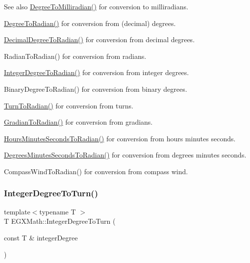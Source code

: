 \begin{DoxySeeAlso}{See also}
\mbox{\hyperlink{group___e_g_x_math-_angle_conversions-_degree_gae4fa6c2d3805430760783650cfbfdb11}{Degree\+To\+Milliradian()}} for conversion to milliradians. 

\mbox{\hyperlink{group___e_g_x_math-_angle_conversions-_degree_ga48585541b228c852c9d08a9eac3682f0}{Degree\+To\+Radian()}} for conversion from (decimal) degrees. 

\mbox{\hyperlink{group___e_g_x_math-_angle_conversions-_decimal_degree_ga906ee2c83cdf4caa59eb613dc2d5d52a}{Decimal\+Degree\+To\+Radian()}} for conversion from decimal degrees. 

Radian\+To\+Radian() for conversion from radians. 

\mbox{\hyperlink{group___e_g_x_math-_angle_conversions-_integer_degree_ga05d3368b00ea27b9895de2ffe5c8df38}{Integer\+Degree\+To\+Radian()}} for conversion from integer degrees. 

Binary\+Degree\+To\+Radian() for conversion from binary degrees. 

\mbox{\hyperlink{group___e_g_x_math-_angle_conversions-_turn_ga72e6d3c46ebfc25f7be5050136d8df16}{Turn\+To\+Radian()}} for conversion from turns. 

\mbox{\hyperlink{group___e_g_x_math-_angle_conversions-_gradian_ga7ea0a6f47a672715b960181606c8fd7b}{Gradian\+To\+Radian()}} for conversion from gradians. 

\mbox{\hyperlink{group___e_g_x_math-_angle_conversions-_hours_minutes_seconds_gaa0b04e9012ec739df1464298971e3be7}{Hours\+Minutes\+Seconds\+To\+Radian()}} for conversion from hours minutes seconds. 

\mbox{\hyperlink{group___e_g_x_math-_angle_conversions-_degrees_minutes_seconds_ga6c99d7a2a1646b3d9c8d40cd7f083aa4}{Degrees\+Minutes\+Seconds\+To\+Radian()}} for conversion from degrees minutes seconds. 

Compass\+Wind\+To\+Radian() for conversion from compass wind. 
\end{DoxySeeAlso}
\mbox{\label{group___e_g_x_math-_angle_conversions-_integer_degree_ga06ddbdada5a3978105c855d4aae735ae}} 
\subsubsection{\texorpdfstring{Integer\+Degree\+To\+Turn()}{IntegerDegreeToTurn()}}
{\footnotesize\ttfamily template$<$typename T $>$ \\
T E\+G\+X\+Math\+::\+Integer\+Degree\+To\+Turn (\begin{DoxyParamCaption}\item[{const T \&}]{integer\+Degree }\end{DoxyParamCaption})}



